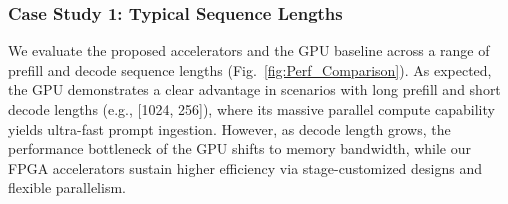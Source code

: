 \documentclass[conference]{IEEEtran}
\begin{document}
\subsubsection{Case Study 1: Typical Sequence Lengths}  

We evaluate the proposed accelerators and the GPU baseline across a range of prefill and decode sequence lengths (Fig.~\ref{fig:Perf_Comparison}). As expected, the GPU demonstrates a clear advantage in scenarios with long prefill and short decode lengths (e.g., [1024, 256]), where its massive parallel compute capability yields ultra-fast prompt ingestion. However, as decode length grows, the performance bottleneck of the GPU shifts to memory bandwidth, while our FPGA accelerators sustain higher efficiency via stage-customized designs and flexible parallelism.


\end{document}
